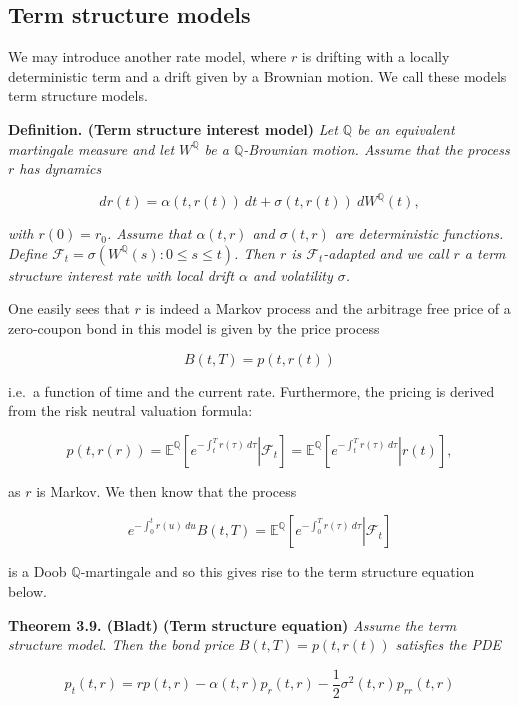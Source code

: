 \documentclass[
]{book}
\begin{document}
\hypertarget{term-structure-models}{%
\subsection{Term structure models}\label{term-structure-models}}

We may introduce another rate model, where \(r\) is drifting with a locally deterministic term and a drift given by a Brownian motion. We call these models term structure models.

\textbf{Definition. (Term structure interest model)} \emph{Let \(\mathbb Q\) be an equivalent martingale measure and let \(W^{\mathbb Q}\) be a \(\mathbb Q\)-Brownian motion. Assume that the process \(r\) has dynamics}

\[
dr(t)=\alpha(t,r(t))\ dt + \sigma(t,r(t))\ dW^{\mathbb Q}(t),
\]

\emph{with \(r(0)=r_0\). Assume that \(\alpha(t,r)\) and \(\sigma(t,r)\) are deterministic functions. Define \(\mathcal F_t=\sigma(W^{\mathbb Q}(s) : 0\le s\le t)\). Then \(r\) is \(\mathcal F_t\)-adapted and we call \(r\) a term structure interest rate with local drift \(\alpha\) and volatility \(\sigma\).}

One easily sees that \(r\) is indeed a Markov process and the arbitrage free price of a zero-coupon bond in this model is given by the price process

\[
B(t,T)=p(t,r(t))
\]

i.e.~a function of time and the current rate. Furthermore, the pricing is derived from the risk neutral valuation formula:

\[
p(t,r(r))=\mathbb E^{\mathbb Q}\left[\left.e^{-\int_t^Tr(\tau)\ d\tau} \right\vert \mathcal{F}_t\right]=\mathbb E^{\mathbb Q}\left[\left.e^{-\int_t^Tr(\tau)\ d\tau} \right\vert r(t)\right],
\]

as \(r\) is Markov. We then know that the process

\[
e^{-\int_0^t r(u)\ du}B(t,T)=\mathbb E^{\mathbb Q}\left[\left.e^{-\int_0^Tr(\tau)\ d\tau} \right\vert \mathcal{F}_t\right]\tag{23}
\]

is a Doob \(\mathbb Q\)-martingale and so this gives rise to the term structure equation below.

\textbf{Theorem 3.9. (Bladt)} \textbf{(Term structure equation)} \emph{Assume the term structure model. Then the bond price \(B(t,T)=p(t,r(t))\) satisfies the PDE}

\[
p_t(t,r)=rp(t,r)-\alpha(t,r)p_r(t,r)-\frac{1}{2}\sigma^2(t,r)p_{rr}(t,r)
\]
\end{document}
